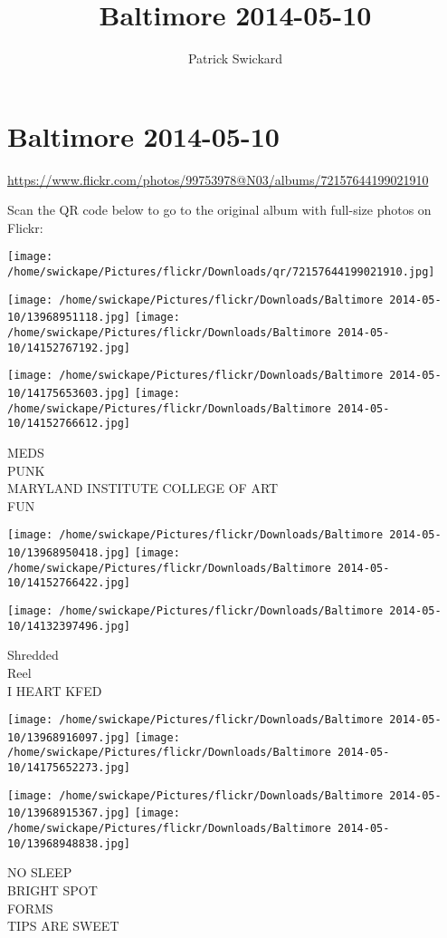 \documentclass[10pt,letterpaper]{article}
\title{Baltimore 2014-05-10}
\author{Patrick Swickard}
\date{}
\begin{document}
\section*{Baltimore 2014-05-10}

\url{https://www.flickr.com/photos/99753978@N03/albums/72157644199021910}

Scan the QR code below to go to the original album with full-size photos on Flickr:

\texttt{[image: /home/swickape/Pictures/flickr/Downloads/qr/72157644199021910.jpg]}
\pagebreak

\texttt{[image: /home/swickape/Pictures/flickr/Downloads/Baltimore 2014-05-10/13968951118.jpg]}
\texttt{[image: /home/swickape/Pictures/flickr/Downloads/Baltimore 2014-05-10/14152767192.jpg]}

\texttt{[image: /home/swickape/Pictures/flickr/Downloads/Baltimore 2014-05-10/14175653603.jpg]}
\texttt{[image: /home/swickape/Pictures/flickr/Downloads/Baltimore 2014-05-10/14152766612.jpg]}

MEDS\\
PUNK\\
MARYLAND INSTITUTE COLLEGE OF ART\\
FUN
\pagebreak

\texttt{[image: /home/swickape/Pictures/flickr/Downloads/Baltimore 2014-05-10/13968950418.jpg]}
\texttt{[image: /home/swickape/Pictures/flickr/Downloads/Baltimore 2014-05-10/14152766422.jpg]}

\vspace{0.25in}
\texttt{[image: /home/swickape/Pictures/flickr/Downloads/Baltimore 2014-05-10/14132397496.jpg]}

Shredded\\
Reel\\
I HEART KFED
\pagebreak

\texttt{[image: /home/swickape/Pictures/flickr/Downloads/Baltimore 2014-05-10/13968916097.jpg]}
\texttt{[image: /home/swickape/Pictures/flickr/Downloads/Baltimore 2014-05-10/14175652273.jpg]}

\texttt{[image: /home/swickape/Pictures/flickr/Downloads/Baltimore 2014-05-10/13968915367.jpg]}
\texttt{[image: /home/swickape/Pictures/flickr/Downloads/Baltimore 2014-05-10/13968948838.jpg]}

NO SLEEP\\
BRIGHT SPOT\\
FORMS\\
TIPS ARE SWEET
\pagebreak
\end{document}
